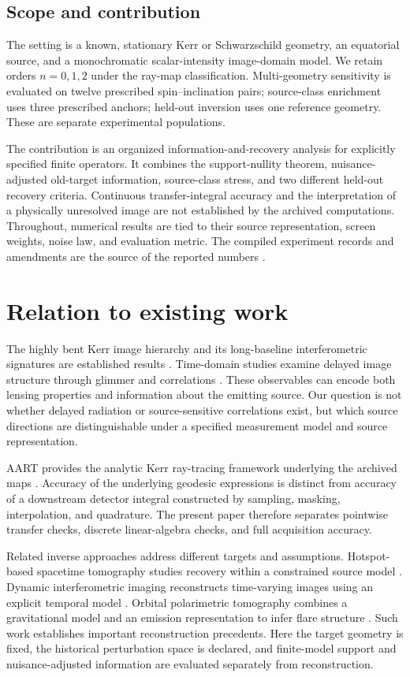 \subsection{Scope and contribution}
The setting is a known, stationary Kerr or Schwarzschild geometry, an equatorial source, and a monochromatic scalar-intensity image-domain model. We retain orders $n=0,1,2$ under the ray-map classification. Multi-geometry sensitivity is evaluated on twelve prescribed spin--inclination pairs; source-class enrichment uses three prescribed anchors; held-out inversion uses one reference geometry. These are separate experimental populations.

The contribution is an organized information-and-recovery analysis for explicitly specified finite operators. It combines the support-nullity theorem, nuisance-adjusted old-target information, source-class stress, and two different held-out recovery criteria. Continuous transfer-integral accuracy and the interpretation of a physically unresolved image are not established by the archived computations. Throughout, numerical results are tied to their source representation, screen weights, noise law, and evaluation metric. The compiled experiment records and amendments are the source of the reported numbers \cite{archive}.

\section{Relation to existing work}\label{sec:related}
The highly bent Kerr image hierarchy and its long-baseline interferometric signatures are established results \cite{gralla,johnson}. Time-domain studies examine delayed image structure through glimmer and correlations \cite{wong,hadar}. These observables can encode both lensing properties and information about the emitting source. Our question is not whether delayed radiation or source-sensitive correlations exist, but which source directions are distinguishable under a specified measurement model and source representation.

AART provides the analytic Kerr ray-tracing framework underlying the archived maps \cite{aart}. Accuracy of the underlying geodesic expressions is distinct from accuracy of a downstream detector integral constructed by sampling, masking, interpolation, and quadrature. The present paper therefore separates pointwise transfer checks, discrete linear-algebra checks, and full acquisition accuracy.

Related inverse approaches address different targets and assumptions. Hotspot-based spacetime tomography studies recovery within a constrained source model \cite{tiede}. Dynamic interferometric imaging reconstructs time-varying images using an explicit temporal model \cite{bouman}. Orbital polarimetric tomography combines a gravitational model and an emission representation to infer flare structure \cite{levis}. Such work establishes important reconstruction precedents. Here the target geometry is fixed, the historical perturbation space is declared, and finite-model support and nuisance-adjusted information are evaluated separately from reconstruction.

